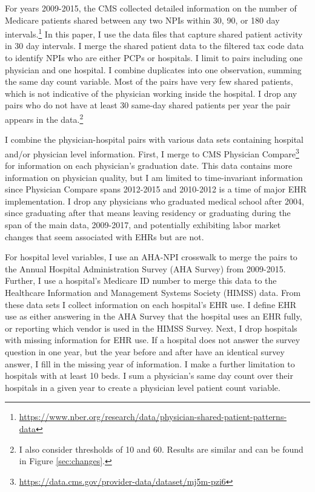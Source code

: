 \documentclass[12pt]{article}
\begin{document}
For years 2009-2015, the CMS collected detailed information on the number of Medicare patients shared between any two NPIs within 30, 90, or 180 day intervals.\footnote{\hyperlink{https://www.nber.org/research/data/physician-shared-patient-patterns-data}{https://www.nber.org/research/data/physician-shared-patient-patterns-data}} In this paper, I use the data files that capture shared patient activity in 30 day intervals. I merge the shared patient data to the filtered tax code data to identify NPIs who are either PCPs or hospitals. I limit to pairs including one physician and one hospital. I combine duplicates into one observation, summing the same day count variable. Most of the pairs have very few shared patients, which is not indicative of the physician working inside the hospital. I drop any pairs who do not have at least 30 same-day shared patients per year the pair appears in the data.\footnote{I also consider thresholds of 10 and 60. Results are similar and can be found in Figure \ref{sec:changes}.}

I combine the physician-hospital pairs with various data sets containing hospital and/or physician level information. First, I merge to CMS Physician Compare\footnote{\hyperlink{https://data.cms.gov/provider-data/dataset/mj5m-pzi6}{https://data.cms.gov/provider-data/dataset/mj5m-pzi6}} for information on each physician's graduation date. This data contains more information on physician quality, but I am limited to time-invariant information since Physician Compare spans 2012-2015 and 2010-2012 is a time of major EHR implementation. I drop any physicians who graduated medical school after 2004, since graduating after that means leaving residency or graduating during the span of the main data, 2009-2017, and potentially exhibiting labor market changes that seem associated with EHRs but are not. 

For hospital level variables, I use an AHA-NPI crosswalk to merge the pairs to the Annual Hospital Administration Survey (AHA Survey) from 2009-2015. Further, I use a hospital's Medicare ID number to merge this data to the Healthcare Information and Management Systems Society (HIMSS) data. From these data sets I collect information on each hospital's EHR use. I define EHR use as either answering in the AHA Survey that the hospital uses an EHR fully, or reporting which vendor is used in the HIMSS Survey. Next, I drop hospitals with missing information for EHR use. If a hospital does not answer the survey question in one year, but the year before and after have an identical survey answer, I fill in the missing year of information. I make a further limitation to hospitals with at least 10 beds. I sum a physician's same day count over their hospitals in a given year to create a physician level patient count variable. 
\end{document}
